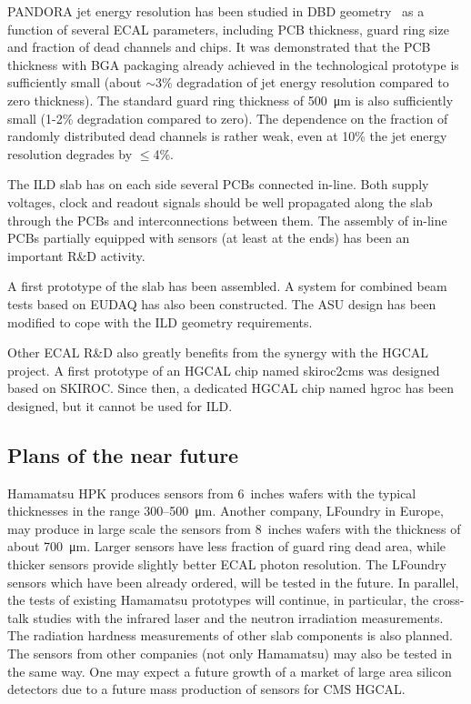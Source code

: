 PANDORA jet energy resolution has been studied in DBD geometry~\cite{Kozakai:2014yka} as
a function of several ECAL parameters, including PCB thickness, guard ring
size and fraction of dead channels and chips. It was demonstrated that the PCB
thickness with BGA packaging already achieved in the technological prototype
is sufficiently small (about $\sim$3\% degradation of jet energy resolution
compared to zero thickness). The standard guard ring thickness of \SI{500}{\micro\meter}
is also sufficiently small (1-2\% degradation compared to zero). The
dependence on the fraction of randomly distributed dead channels is rather
weak, even at 10\% the jet energy resolution degrades by $\le$4\%.

The ILD slab has on each side several PCBs connected in-line. Both supply
voltages, clock and readout signals should be well propagated along the slab
through the PCBs and interconnections between them. The assembly of in-line
PCBs partially equipped with sensors (at least at the ends) has been an important
R\&D activity.

A first prototype of the slab has been assembled. A system for combined beam tests based on
EUDAQ has also been constructed. The ASU design has been modified to cope with the ILD geometry
requirements.

Other ECAL R\&D also greatly benefits from the synergy with the HGCAL
project. A first prototype of an HGCAL chip named skiroc2cms was designed based on SKIROC.
Since then, a dedicated HGCAL chip named hgroc has been designed, but it cannot be used for ILD.

\subsection{Plans of the near future}
Hamamatsu HPK produces sensors from \SI{6}{inches} wafers with the typical
thicknesses in the range 300--\SI{500}{\micro\meter}. Another company, LFoundry in Europe,
may produce in large scale the sensors from \SI{8}{inches} wafers with the thickness
of about \SI{700}{\micro\meter}. Larger sensors have less fraction of guard ring dead
area, while thicker sensors provide slightly better ECAL photon
resolution. The LFoundry sensors which have been already ordered, will be
tested in the future. In parallel, the tests of existing Hamamatsu prototypes
will continue, in particular, the cross-talk studies with the infrared laser
and the neutron irradiation measurements. The radiation hardness measurements
of other slab components is also planned. The sensors from other companies
(not only Hamamatsu) may also be tested in the same way. One may expect a
future growth of a market of large area silicon detectors due to a future mass
production of sensors for CMS HGCAL.

